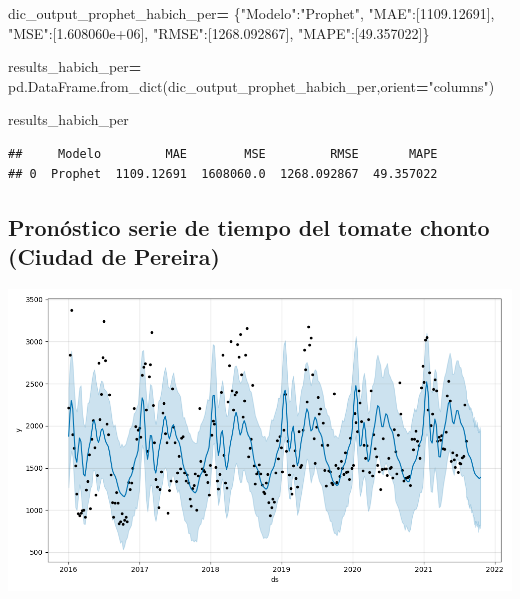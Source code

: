 \documentclass[
]{book}
\newenvironment{Shaded}{\begin{snugshade}}{\end{snugshade}}
\newcommand{\FloatTok}[1]{\textcolor[rgb]{0.00,0.00,0.81}{#1}}
\newcommand{\NormalTok}[1]{#1}
\newcommand{\OperatorTok}[1]{\textcolor[rgb]{0.81,0.36,0.00}{\textbf{#1}}}
\newcommand{\StringTok}[1]{\textcolor[rgb]{0.31,0.60,0.02}{#1}}
\begin{document}
\begin{Shaded}
\begin{Highlighting}[]

\NormalTok{dic\_output\_prophet\_habich\_per}\OperatorTok{=}\NormalTok{ \{}\StringTok{"Modelo"}\NormalTok{:}\StringTok{"Prophet"}\NormalTok{,}
                 \StringTok{"MAE"}\NormalTok{:[}\FloatTok{1109.12691}\NormalTok{],}
                 \StringTok{"MSE"}\NormalTok{:[}\FloatTok{1.608060e+06}\NormalTok{],}
                 \StringTok{"RMSE"}\NormalTok{:[}\FloatTok{1268.092867}\NormalTok{],}
                 \StringTok{"MAPE"}\NormalTok{:[}\FloatTok{49.357022}\NormalTok{]\}}

\NormalTok{results\_habich\_per}\OperatorTok{=}\NormalTok{ pd.DataFrame.from\_dict(dic\_output\_prophet\_habich\_per,orient}\OperatorTok{=}\StringTok{"columns"}\NormalTok{)}

\NormalTok{results\_habich\_per}
\end{Highlighting}
\end{Shaded}

\begin{verbatim}
##     Modelo         MAE        MSE         RMSE       MAPE
## 0  Prophet  1109.12691  1608060.0  1268.092867  49.357022
\end{verbatim}

\hypertarget{pronuxf3stico-serie-de-tiempo-del-tomate-chonto-ciudad-de-pereira-2}{%
\subsection{Pronóstico serie de tiempo del tomate chonto (Ciudad de Pereira)}\label{pronuxf3stico-serie-de-tiempo-del-tomate-chonto-ciudad-de-pereira-2}}

\includegraphics{Prophet_Tomate_PER.png}
\end{document}

